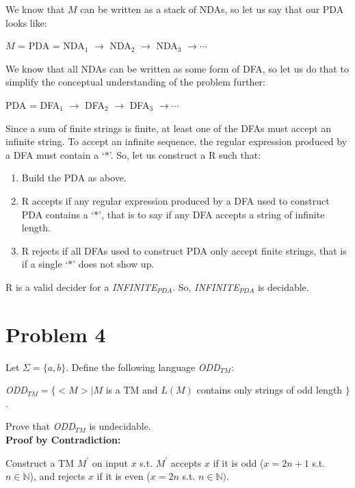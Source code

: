 \documentclass[11pt]{article}
\begin{document}
    We know that $M$ can be written as a stack of NDAs, so let us say that our PDA looks like:
    \begin{center}
        $M$ = PDA = NDA$_1$ $\rightarrow$ NDA$_2$ $\rightarrow$ NDA$_3$ $\rightarrow \cdots$ 
    \end{center}
    We know that all NDAs can be written as some form of DFA, so let us do that to simplify the conceptual understanding of the problem further:
    \begin{center}
        PDA = DFA$_1$ $\rightarrow$ DFA$_2$ $\rightarrow$ DFA$_3$ $\rightarrow \cdots$ 
    \end{center}
    Since a sum of finite strings is finite, at least one of the DFAs must accept an infinite string. To accept an infinite sequence, the regular expression produced by a DFA must contain a `$*$'. So, let us construct a R such that:
    \begin{enumerate}
        \item Build the PDA as above.
        \item R accepts if any regular expression produced by a DFA used to construct PDA contains a `$*$', that is to say if any DFA accepts a string of infinite length.
        \item R rejects if all DFAs used to construct PDA only accept finite strings, that is if a single `$*$' does not show up. 
    \end{enumerate}
    R is a valid decider for a {\em INFINITE}$_{PDA}$. So, {\em INFINITE}$_{PDA}$ is decidable.
\newpage





\section*{Problem 4}

    Let $\Sigma=\{a,b\}$. Define the following language {\em ODD}$_{TM}$:
    \begin{center}
        {\em ODD}$_{TM}=\{ <M>|M$ is a TM and $L(M)$ contains only strings of odd length $\}$.
    \end{center}
    Prove that {\em ODD}$_{TM}$ is undecidable.\\
    
    
    \textbf{Proof by Contradiction:}
    
    Construct a TM $M^\prime$ on input $x$ s.t. $M^\prime$ accepts $x$ if it is odd ($x = 2n+1$ s.t. $n \in \mathbb{N}$), and rejects $x$ if it is even ($x = 2n$ s.t. $n \in \mathbb{N})$. 
    
\end{document}
